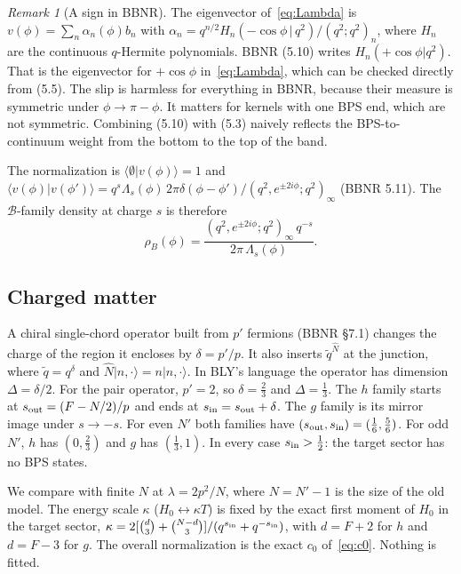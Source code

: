 \documentclass[11pt]{article}
\newcommand{\Np}{N'}
\newcommand{\sI}{s_{\rm in}}
\newcommand{\sout}{s_{\rm out}}
\newcommand{\qt}{\tilde q}
\newcommand{\Nh}{\hat N}
\newcommand{\poch}[2]{(#1;#2)_\infty}
\theoremstyle{plain}
\theoremstyle{remark}
\newtheorem*{remark}{Remark}
\numberwithin{equation}{section}
\begin{document}
\begin{remark}[A sign in BBNR]
The eigenvector of~\eqref{eq:Lambda} is $v(\phi)=\sum_n\alpha_n(\phi)b_n$ with
$\alpha_n=q^{n/2}H_n(-\cos\phi\,|\,q^2)/(q^2;q^2)_n$, where $H_n$ are the continuous $q$-Hermite polynomials. BBNR
(5.10) writes $H_n(+\cos\phi|q^2)$. That is the eigenvector for $+\cos\phi$ in~\eqref{eq:Lambda}, which can be checked
directly from (5.5). The slip is harmless for everything in BBNR, because their measure is symmetric under
$\phi\to\pi-\phi$. It matters for kernels with one BPS end, which are not symmetric. Combining (5.10) with (5.3)
naively reflects the BPS-to-continuum weight from the bottom to the top of the band.
\end{remark}

The normalization is $\langle\emptyset|v(\phi)\rangle=1$ and
$\langle v(\phi)|v(\phi')\rangle=q^s\Lambda_s(\phi)\,2\pi\delta(\phi-\phi')/\poch{q^2,e^{\pm2i\phi}}{q^2}$
(BBNR 5.11). The $\mathcal B$-family density at charge $s$ is therefore
\begin{equation}\label{eq:rhoB}
\rho_B(\phi)=\frac{\poch{q^2,e^{\pm2i\phi}}{q^2}\,q^{-s}}{2\pi\,\Lambda_s(\phi)} .
\end{equation}

\subsection{Charged matter}

A chiral single-chord operator built from $p'$ fermions (BBNR \S7.1) changes the charge of the region it encloses by
$\delta=p'/p$. It also inserts $\qt^{\Nh}$ at the junction, where $\qt=q^{\delta}$ and $\Nh|n,\cdot\rangle=n|n,\cdot\rangle$.
In BLY's language the operator has dimension $\Delta=\delta/2$. For the pair operator, $p'=2$, so $\delta=\tfrac23$ and
$\Delta=\tfrac13$. The $h$ family starts at $\sout=(F-N/2)/p$ and ends at $\sI=\sout+\delta$. The $g$ family is its mirror
image under $s\to-s$. For even $\Np$ both families have $(\sout,\sI)=(\tfrac16,\tfrac56)$. For odd $\Np$, $h$ has
$(0,\tfrac23)$ and $g$ has $(\tfrac13,1)$. In every case $\sI>\tfrac12$: the target sector has no BPS states.

We compare with finite $N$ at $\lambda=2p^2/N$, where $N=\Np-1$ is the size of the old model. The energy scale $\kappa$
($H_0\leftrightarrow\kappa T$) is fixed by the exact first moment of $H_0$ in the target sector,
$\kappa=2[\binom{d}{3}+\binom{N-d}{3}]/(q^{\sI}+q^{-\sI})$, with $d=F+2$ for $h$ and $d=F-3$ for $g$. The overall
normalization is the exact $c_0$ of~\eqref{eq:c0}. Nothing is fitted.
\end{document}

